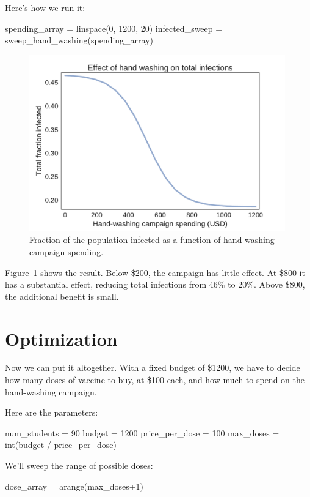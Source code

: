 \documentclass[12pt]{book}
\theoremstyle{exercise}
\begin{document}
Here's how we run it:

\begin{python}
spending_array = linspace(0, 1200, 20)
infected_sweep = sweep_hand_washing(spending_array)
\end{python}

\begin{figure}
\centerline{\includegraphics[height=3in]{figs/chap05-fig05.pdf}}
\caption{Fraction of the population infected as a function of hand-washing campaign spending.}
\label{chap05-fig05}
\end{figure} 

Figure~\ref{chap05-fig05} shows the result.  Below \$200, the campaign has little effect.  At \$800 it has a substantial effect, reducing total infections from 46\% to 20\%.  Above \$800, the additional benefit is small.

\section{Optimization} 

Now we can put it altogether.  With a fixed budget of \$1200, we have to decide how many doses of vaccine to buy, at \$100 each, and how much to spend on the hand-washing campaign.

Here are the parameters:

\begin{python}
num_students = 90
budget = 1200
price_per_dose = 100
max_doses = int(budget / price_per_dose)
\end{python}

We'll sweep the range of possible doses:

\begin{python}
dose_array = arange(max_doses+1)
\end{python}
\end{document}
